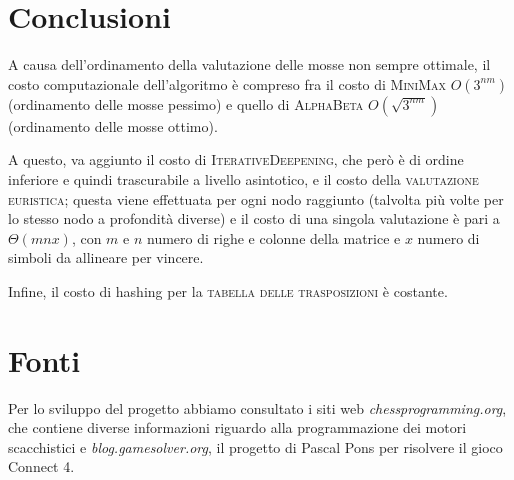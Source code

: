 \documentclass{article}
\begin{document}
\section{Conclusioni}
A causa dell'ordinamento della valutazione delle mosse non sempre ottimale, il costo 
computazionale dell'algoritmo è compreso fra il costo di \textsc{MiniMax} $O(3^{nm})$ (ordinamento delle mosse
pessimo) e quello di \textsc{AlphaBeta} $O({\sqrt{3^{nm}}})$ (ordinamento delle mosse ottimo). 

A questo, va aggiunto il costo di \textsc{IterativeDeepening}, che però è di ordine inferiore e quindi 
trascurabile a livello asintotico, e il costo della \textsc{valutazione euristica}; questa viene effettuata 
per ogni nodo raggiunto (talvolta più volte per lo stesso nodo a profondità diverse) e il costo di una singola 
valutazione è pari a $\Theta(mnx)$, con $m$ e $n$ numero di righe e colonne della matrice e $x$ numero di simboli
da allineare per vincere.

Infine, il costo di hashing per la \textsc{tabella delle trasposizioni} è costante.

\section{Fonti}

Per lo sviluppo del progetto abbiamo consultato i siti web \textit{chessprogramming.org}, che contiene
diverse informazioni riguardo alla programmazione dei motori scacchistici e 
\textit{blog.gamesolver.org}, il progetto di Pascal Pons per risolvere il gioco Connect 4.
\end{document}
